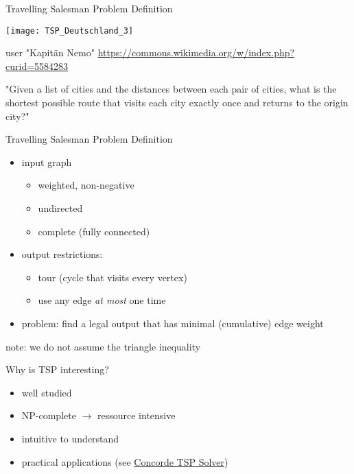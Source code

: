 \begin{frame}{Travelling Salesman Problem Definition}
\begin{minipage}{0.45\textwidth}
  \texttt{[image: TSP\_Deutschland\_3]}
  \tiny

  user "Kapitän Nemo" \url{https://commons.wikimedia.org/w/index.php?curid=5584283}
\end{minipage}
\begin{minipage}{0.45\textwidth}

"Given a list of cities and the distances between each pair of cities, what is the shortest possible route that visits each city exactly once and returns to the origin city?"
\cite{song_solving_2021}
\end{minipage}
\end{frame}

\begin{frame}{Travelling Salesman Problem Definition}
  \begin{itemize}
    \item input graph
      \begin{itemize}
        \item weighted, non-negative
        \item undirected
        \item complete (fully connected)
      \end{itemize}

    \pause
    \item output restrictions:
      \begin{itemize}
        \item tour (cycle that visits every vertex)
        \item use any edge \emph{at most} one time
      \end{itemize}
    \pause
    \item problem: find a legal output that has minimal (cumulative) edge weight
  \end{itemize}
  \pause
  note: we do not assume the triangle inequality
\end{frame}

\begin{frame}{Why is TSP interesting?}
  \begin{itemize}
    \item well studied
    \item NP-complete $\rightarrow$ ressource intensive
    \item intuitive to understand
    \pause
    \item practical applications (see \href{https://en.wikipedia.org/wiki/Concorde_TSP_Solver}{Concorde TSP Solver})
  \end{itemize}
\end{frame}
